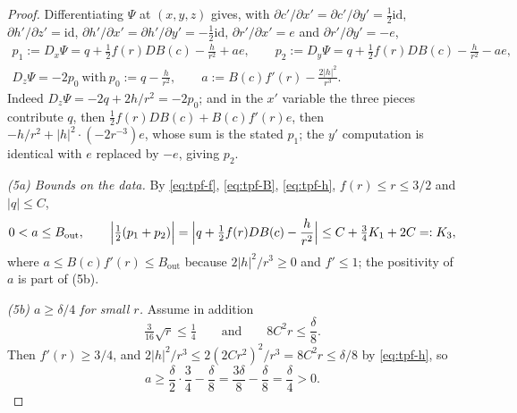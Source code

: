 \begin{proof}
Differentiating $\Psi$ at $(x,y,z)$ gives, with $\partial c'/\partial
x'=\partial c'/\partial y'=\tfrac12\mathrm{id}$, $\partial h'/\partial
z'=\mathrm{id}$, $\partial h'/\partial x'=\partial h'/\partial
y'=-\tfrac12\mathrm{id}$, $\partial r'/\partial x'=e$ and $\partial
r'/\partial y'=-e$,
\begin{equation}\label{eq:tpf-grads}
\begin{gathered}
  p_1:=D_{x}\Psi=q+\tfrac12f(r)DB(c)-\frac{h}{r^2}+ae,\qquad
  p_2:=D_{y}\Psi=q+\tfrac12f(r)DB(c)-\frac{h}{r^2}-ae,\\
  D_{z}\Psi=-2p_0\ \text{with}\ p_0:=q-\frac{h}{r^2},
  \qquad a:=B(c)f'(r)-\frac{2|h|^2}{r^3}.
\end{gathered}
\end{equation}
Indeed $D_z\Psi=-2q+2h/r^2=-2p_0$; and in the $x'$ variable the three pieces
contribute $q$, then
$\tfrac12f(r)DB(c)+B(c)f'(r)e$, then
$-h/r^2+|h|^2\cdot(-2r^{-3})e$, whose sum is the stated $p_1$; the $y'$
computation is identical with $e$ replaced by $-e$, giving $p_2$.

\emph{(5a) Bounds on the data.} By \eqref{eq:tpf-f}, \eqref{eq:tpf-B},
\eqref{eq:tpf-h}, $f(r)\le r\le3/2$ and $|q|\le C$,
\begin{equation}\label{eq:tpf-bounds}
  0<a\le B_{\mathrm{out}},\qquad
  \Bigl|\tfrac12(p_1+p_2)\Bigr|=\Bigl|q+\tfrac12f(r)DB(c)-\frac h{r^2}\Bigr|
   \le C+\tfrac34K_1+2C=:K_3,
\end{equation}
where $a\le B(c)f'(r)\le B_{\mathrm{out}}$ because $2|h|^2/r^3\ge0$ and
$f'\le1$; the positivity of $a$ is part of (5b).

\emph{(5b) $a\ge\delta/4$ for small $r$.} Assume in addition
\begin{equation}\label{eq:tpf-r2}
  \tfrac3{16}\sqrt r\le\tfrac14\qquad\text{and}\qquad 8C^2r\le\frac\delta8 .
\end{equation}
Then $f'(r)\ge3/4$, and $2|h|^2/r^3\le2(2Cr^2)^2/r^3=8C^2r\le\delta/8$ by
\eqref{eq:tpf-h}, so
\[
  a\ge\frac\delta2\cdot\frac34-\frac\delta8=\frac{3\delta}8-\frac\delta8
   =\frac\delta4>0 .
\]


\end{proof}
